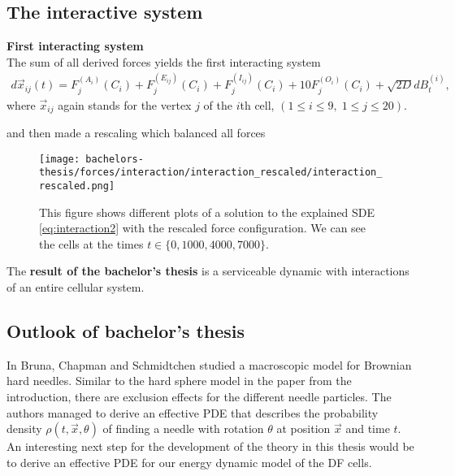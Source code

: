 \newpage 
\subsection*{The interactive system} 
\begin{model} \textbf{First interacting system} \label{model:interaction1}\\ 
	The sum of all derived forces yields the first interacting system
	\begin{align}
		d\vec{x}_{ij}(t) =  F^{(A_i)}_j(C_i) + F^{(E_{ij})}_j(C_i) +F^{(I_{ij})}_j(C_i) +10 F^{(O_i)}_j(C_i) + \sqrt{2D} dB_t^{(i)}, \label{eq:interaction1}
	\end{align}
	where $\vec{x}_{ij}$ again stands for the vertex $j$ of the $i$th cell, $(1\leq i \leq9, \; 1\leq j \leq 20)$. 
\end{model}

and then made a rescaling which balanced all forces 
\begin{figure}[h!]
	\begin{center}
		\texttt{[image: bachelors-thesis/forces/interaction/interaction\_rescaled/interaction\_rescaled.png]}
		\caption{This figure shows different plots of a solution to the explained SDE \eqref{eq:interaction2} with the rescaled force configuration. We can see the cells at the times $t \in \{ 0, 1000, 4000, 7000\}$. }
		\label{fig:interaction_rescaled}
	\end{center}
\end{figure}

The \textbf{result of the bachelor's thesis} is a serviceable dynamic with interactions of an entire cellular system.

\newpage
\subsection*{Outlook of bachelor's thesis}
In \cite{Bruna2023} Bruna, Chapman and Schmidtchen studied a macroscopic model for Brownian hard needles. Similar to the hard sphere model in the paper \cite{Bruna2012} from the introduction, there are exclusion effects for the different needle particles. The authors managed to derive an effective PDE that describes the probability density $\rho(t,\vec{x}, \theta)$ of finding a needle with rotation $\theta$ at position $\vec{x}$ and time $t$. An interesting next step for the development of the theory in this thesis would be to derive an effective PDE for our energy dynamic model of the DF cells. \\
